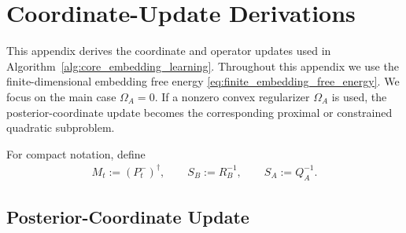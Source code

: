 \documentclass[twoside,11pt]{article}
\begin{document}
\section{Coordinate-Update Derivations}
\label{app:coordinate_update_derivations}

This appendix derives the coordinate and operator updates used in
Algorithm~\ref{alg:core_embedding_learning}. Throughout this appendix we
use the finite-dimensional embedding free energy
\eqref{eq:finite_embedding_free_energy}. We focus on the main case
$\Omega_A=0$. If a nonzero convex regularizer $\Omega_A$ is used, the
posterior-coordinate update becomes the corresponding proximal or
constrained quadratic subproblem.

For compact notation, define
\begin{align}
M_t
:=
(P_t^-)^\dagger,
\qquad
S_B
:=
R_B^{-1},
\qquad
S_A
:=
Q_A^{-1}.
\label{eq:app_metric_short_notation}
\end{align}

\subsection{Posterior-Coordinate Update}
\end{document}
